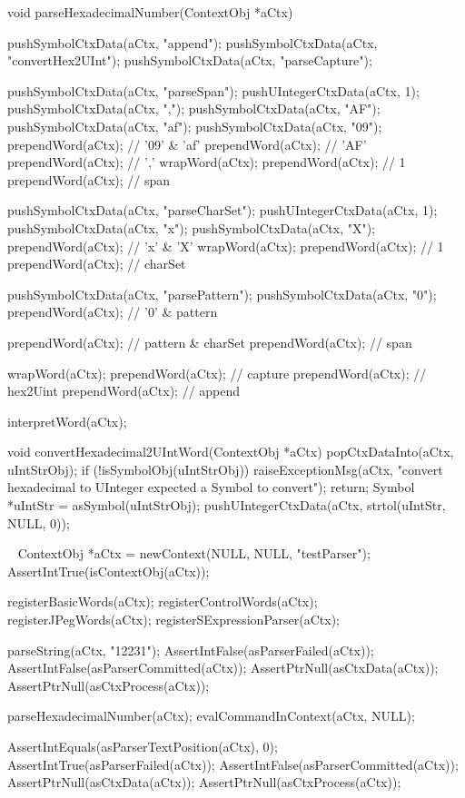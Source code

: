 \startCCode
void parseHexadecimalNumber(ContextObj *aCtx) {

  pushSymbolCtxData(aCtx, "append");
  pushSymbolCtxData(aCtx, "convertHex2UInt");
  pushSymbolCtxData(aCtx, "parseCapture");

  pushSymbolCtxData(aCtx, "parseSpan");
  pushUIntegerCtxData(aCtx, 1);
  pushSymbolCtxData(aCtx, ",");
  pushSymbolCtxData(aCtx, "AF");
  pushSymbolCtxData(aCtx, "af");
  pushSymbolCtxData(aCtx, "09");
  prependWord(aCtx); // '09' & 'af'
  prependWord(aCtx); // 'AF'
  prependWord(aCtx); // ','
  wrapWord(aCtx);
  prependWord(aCtx); // 1
  prependWord(aCtx); // span

  pushSymbolCtxData(aCtx, "parseCharSet");
  pushUIntegerCtxData(aCtx, 1);
  pushSymbolCtxData(aCtx, "x");
  pushSymbolCtxData(aCtx, "X");
  prependWord(aCtx); // 'x' & 'X'
  wrapWord(aCtx);
  prependWord(aCtx); // 1
  prependWord(aCtx); // charSet

  pushSymbolCtxData(aCtx, "parsePattern");
  pushSymbolCtxData(aCtx, "0");
  prependWord(aCtx); // '0' & pattern
  
  prependWord(aCtx); // pattern & charSet
  prependWord(aCtx); // span
  
  wrapWord(aCtx);
  prependWord(aCtx); // capture
  prependWord(aCtx); // hex2Uint
  prependWord(aCtx); // append
  
  interpretWord(aCtx);
}

void convertHexadecimal2UIntWord(ContextObj *aCtx) {
  popCtxDataInto(aCtx, uIntStrObj);
  if (!isSymbolObj(uIntStrObj)) {
    raiseExceptionMsg(aCtx,
      "convert hexadecimal to UInteger expected a Symbol to convert");
    return;
  }
  Symbol *uIntStr = asSymbol(uIntStrObj);  
  pushUIntegerCtxData(aCtx, strtol(uIntStr, NULL, 0));  
}
\stopCCode

\CTestsSuiteSetup\
\startCTest
  ContextObj *aCtx = newContext(NULL, NULL, "testParser");
  AssertIntTrue(isContextObj(aCtx));
  
  registerBasicWords(aCtx);
  registerControlWords(aCtx);
  registerJPegWords(aCtx);
  registerSExpressionParser(aCtx);
\stopCTest

\startCTest
  parseString(aCtx, "12231");
  AssertIntFalse(asParserFailed(aCtx));
  AssertIntFalse(asParserCommitted(aCtx));
  AssertPtrNull(asCtxData(aCtx));
  AssertPtrNull(asCtxProcess(aCtx));
  
  parseHexadecimalNumber(aCtx);
  evalCommandInContext(aCtx, NULL);
  
  AssertIntEquals(asParserTextPosition(aCtx), 0);
  AssertIntTrue(asParserFailed(aCtx));
  AssertIntFalse(asParserCommitted(aCtx));
  AssertPtrNull(asCtxData(aCtx));
  AssertPtrNull(asCtxProcess(aCtx));
\stopCTest
\stopTestCase

